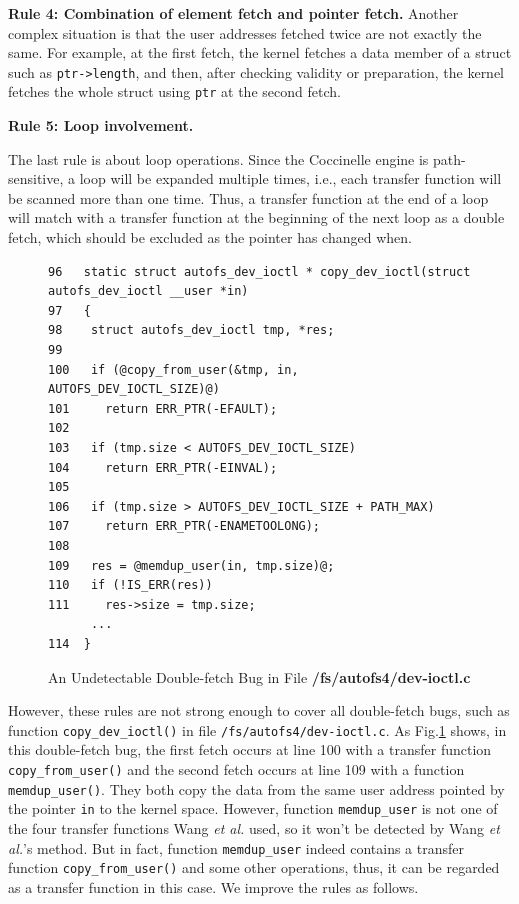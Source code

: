 \documentclass[10pt]{llncs}
\begin{document}
\textbf{Rule 4: Combination of element fetch and pointer fetch.}
Another complex situation is that the user addresses fetched twice are not exactly the same. For example, at the first fetch, the kernel fetches a data member of a struct such as \verb:ptr->length:, and then, after checking validity or preparation, the kernel fetches the whole struct using \verb:ptr: at the second fetch.

\textbf{Rule 5: Loop involvement.}

The last rule is about loop operations. Since the Coccinelle engine is path-sensitive, 
a loop will be expanded multiple times, i.e., each transfer function will be scanned 
more than one time. Thus, a transfer function at the end of a loop will match with a transfer function at the beginning of the next loop as a double fetch, which should be excluded as the pointer has changed when.





\begin{figure}[t]
  \centering
\begin{lstlisting}[style=code]
96   static struct autofs_dev_ioctl * copy_dev_ioctl(struct autofs_dev_ioctl __user *in)
97   {
98    struct autofs_dev_ioctl tmp, *res;
99   
100   if (@copy_from_user(&tmp, in, AUTOFS_DEV_IOCTL_SIZE)@)
101     return ERR_PTR(-EFAULT);
102  
103   if (tmp.size < AUTOFS_DEV_IOCTL_SIZE)
104     return ERR_PTR(-EINVAL);
105  
106   if (tmp.size > AUTOFS_DEV_IOCTL_SIZE + PATH_MAX)
107     return ERR_PTR(-ENAMETOOLONG);
108  
109   res = @memdup_user(in, tmp.size)@;
110   if (!IS_ERR(res))
111     res->size = tmp.size;
	  ...
114  }   
\end{lstlisting}
  \caption{An Undetectable Double-fetch Bug in File \textbf{/fs/autofs4/dev-ioctl.c}}
  \label{dev-ioctl}
\end{figure}




However, these rules are not strong enough to cover all double-fetch bugs, such as function
\verb:copy_dev_ioctl(): in file \verb:/fs/autofs4/dev-ioctl.c:. As Fig.\ref{dev-ioctl} shows, 
in this double-fetch bug, the first fetch occurs at line 100 with a transfer function \verb:copy_from_user(): and the second fetch occurs at line 109 with a function 
\verb:memdup_user():. They both copy the data from the same user address pointed by the 
pointer \verb:in: to the kernel space. However, function \verb:memdup_user: is not one of 
the four transfer functions Wang \textit{et al.} used, so it won't be detected by Wang 
\textit{et al.}'s method. But in fact, function \verb:memdup_user: indeed contains a 
transfer function \verb:copy_from_user(): and some other operations, thus, it can be 
regarded as a transfer function in this case. We improve the rules as follows.
\end{document}
